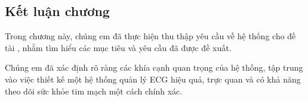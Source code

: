 \subsection{Kết luận chương}

Trong chương này, chúng em đã thực hiện thu thập yêu cầu về
 hệ thống cho đề tài , nhằm tìm hiểu
  các mục tiêu và yêu cầu đã được đề xuất.

Chúng em đã xác định rõ ràng các khía cạnh quan trọng của hệ thống,
 tập trung vào việc thiết kế một hệ thống quản lý ECG hiệu quả,
  trực quan và có khả năng theo dõi sức khỏe tim mạch một cách
   chính xác. 


\newpage

